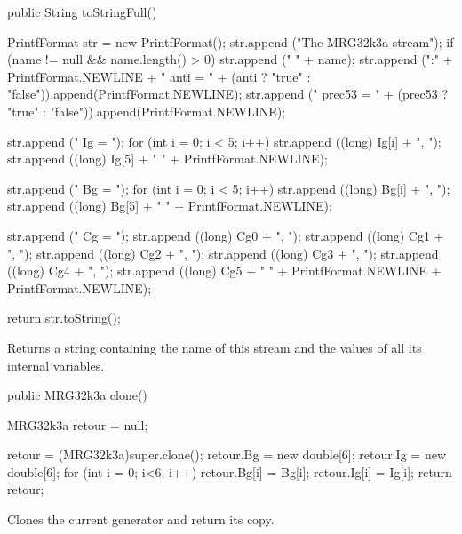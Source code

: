 \begin{code}

   public String toStringFull() \begin{hide} {
      PrintfFormat str = new PrintfFormat();
      str.append ("The MRG32k3a stream");
      if (name != null && name.length() > 0)
         str.append (" " + name);
      str.append (":" + PrintfFormat.NEWLINE + "   anti = " +
         (anti ? "true" : "false")).append(PrintfFormat.NEWLINE);
      str.append ("   prec53 = " + (prec53 ? "true" : "false")).append(PrintfFormat.NEWLINE);

      str.append ("   Ig = { ");
      for (int i = 0; i < 5; i++)
         str.append ((long) Ig[i] + ", ");
      str.append ((long) Ig[5] + " }" + PrintfFormat.NEWLINE);

      str.append ("   Bg = { ");
      for (int i = 0; i < 5; i++)
         str.append ((long) Bg[i] + ", ");
      str.append ((long) Bg[5] + " }" + PrintfFormat.NEWLINE);

      str.append ("   Cg = { ");
      str.append ((long) Cg0 + ", ");
      str.append ((long) Cg1 + ", ");
      str.append ((long) Cg2 + ", ");
      str.append ((long) Cg3 + ", ");
      str.append ((long) Cg4 + ", ");
      str.append ((long) Cg5 + " }" + PrintfFormat.NEWLINE +
          PrintfFormat.NEWLINE);

      return str.toString();
   }\end{hide}
\end{code}
 \begin{tabb} Returns a string containing the name of this stream and the
   values of all its internal variables.
 \end{tabb}
\begin{htmlonly}
\end{htmlonly}
\begin{code}

   public MRG32k3a clone() \begin{hide} {
      MRG32k3a retour = null;

      retour = (MRG32k3a)super.clone();
      retour.Bg = new double[6];
      retour.Ig = new double[6];
      for (int i = 0; i<6; i++) {
         retour.Bg[i] = Bg[i];
         retour.Ig[i] = Ig[i];
      }
      return retour;
   }\end{hide}
\end{code}
 \begin{tabb} Clones the current generator and return its copy.
 \end{tabb}
